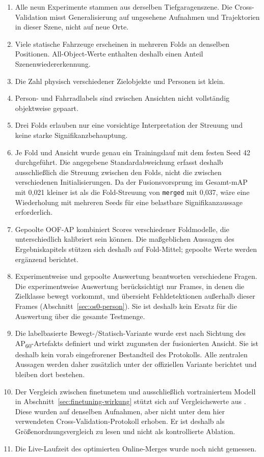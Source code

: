 \begin{enumerate}
    \item Alle neun Experimente stammen aus derselben Tiefgaragenszene. Die Cross-Validation misst Generalisierung auf ungesehene Aufnahmen und Trajektorien in dieser Szene, nicht auf neue Orte.
    \item Viele statische Fahrzeuge erscheinen in mehreren Folds an denselben Positionen. All-Object-Werte enthalten deshalb einen Anteil Szenenwiedererkennung.
    \item Die Zahl physisch verschiedener Zielobjekte und Personen ist klein.
    \item Person- und Fahrradlabels sind zwischen Ansichten nicht vollständig objektweise gepaart.
    \item Drei Folds erlauben nur eine vorsichtige Interpretation der Streuung und keine starke Signifikanzbehauptung.
    \item Je Fold und Ansicht wurde genau ein Trainingslauf mit dem festen Seed 42 durchgeführt. Die angegebene Standardabweichung erfasst deshalb ausschließlich die Streuung zwischen den Folds, nicht die zwischen verschiedenen Initialisierungen. Da der Fusionsvorsprung im Gesamt-mAP mit 0{,}021 kleiner ist als die Fold-Streuung von \texttt{merged} mit 0{,}037, wäre eine Wiederholung mit mehreren Seeds für eine belastbare Signifikanzaussage erforderlich.
    \item Gepoolte OOF-AP kombiniert Scores verschiedener Foldmodelle, die unterschiedlich kalibriert sein können. Die maßgeblichen Aussagen des Ergebniskapitels stützen sich deshalb auf Fold-Mittel; gepoolte Werte werden ergänzend berichtet.
    \item Experimentweise und gepoolte Auswertung beantworten verschiedene Fragen. Die experimentweise Auswertung berücksichtigt nur Frames, in denen die Zielklasse bewegt vorkommt, und übersieht Fehldetektionen außerhalb dieser Frames (Abschnitt~\ref{sec:os0-person}). Sie ist deshalb kein Ersatz für die Auswertung über die gesamte Testmenge.
    \item Die labelbasierte Bewegt-/Statisch-Variante wurde erst nach Sichtung des AP\textsubscript{60}-Artefakts definiert und wirkt zugunsten der fusionierten Ansicht. Sie ist deshalb kein vorab eingefrorener Bestandteil des Protokolls. Alle zentralen Aussagen werden daher zusätzlich unter der offiziellen Variante berichtet und bleiben dort bestehen.
    \item Der Vergleich zwischen finetunetem und ausschließlich vortrainiertem Modell in Abschnitt~\ref{sec:finetuning-wirkung} stützt sich auf Vergleichswerte aus \cite{pagel2025railway}. Diese wurden auf denselben Aufnahmen, aber nicht unter dem hier verwendeten Cross-Validation-Protokoll erhoben. Er ist deshalb als Größenordnungsvergleich zu lesen und nicht als kontrollierte Ablation.
    \item Die Live-Laufzeit des optimierten Online-Merges wurde noch nicht gemessen.
\end{enumerate}
